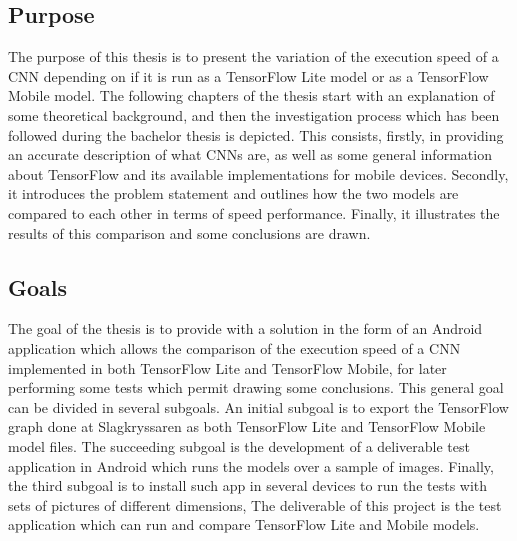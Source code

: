\subsection{Purpose}
The purpose of this thesis is to present the variation of the execution speed of a CNN depending on if it is run as a TensorFlow Lite model or as a TensorFlow Mobile model. The following chapters of the thesis start with an explanation of some theoretical background, and then the investigation process which has been followed during the bachelor thesis is depicted. This consists, firstly, in providing an accurate description of what CNNs are, as well as some general information about TensorFlow and its available implementations for mobile devices. Secondly, it introduces the problem statement and outlines how the two models are compared to each other in terms of speed performance. Finally, it illustrates the results of this comparison and some conclusions are drawn.

\subsection{Goals}
The goal of the thesis is to provide with a solution in the form of an Android application which allows the comparison of the execution speed of a CNN implemented in both TensorFlow Lite and TensorFlow Mobile, for later performing some tests which permit drawing some conclusions. This general goal can be divided in several subgoals. An initial subgoal is to export the TensorFlow graph done at Slagkryssaren as both TensorFlow Lite and TensorFlow Mobile model files. The succeeding subgoal is the development of a deliverable test application in Android which runs the models over a sample of images. Finally, the third subgoal is to install such app in several devices to run the tests with sets of pictures of different dimensions,
The deliverable of this project is the test application which can run and compare TensorFlow Lite and Mobile models.

